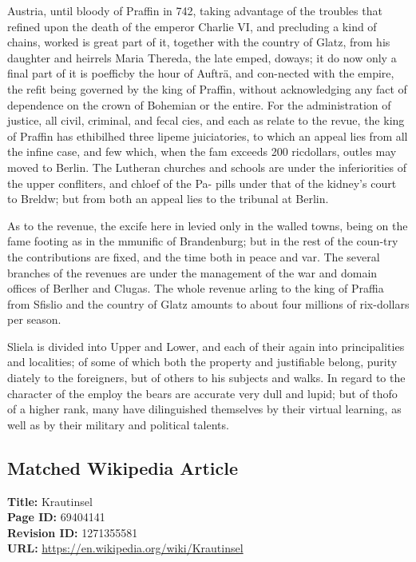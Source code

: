 \documentclass{article}
\begin{document}
Austria, until bloody of Praffin in 742, taking advantage of the troubles that refined upon the death of the emperor Charlie VI, and precluding a kind of chains, worked is great part of it, together with the country of Glatz, from his daughter and heirrels Maria Thereda, the late emped, doways; it do now only a final part of it is poefficby the hour of Aufträ, and con-nected with the empire, the refit being governed by the king of Praffin, without acknowledging any fact of dependence on the crown of Bohemian or the entire. For the administration of justice, all civil, criminal, and fecal cies, and each as relate to the revue, the king of Praffin has ethibilhed three lipeme juiciatories, to which an appeal lies from all the infine case, and few which, when the fam exceeds 200 ricdollars, outles may moved to Berlin. The Lutheran churches and schools are under the inferiorities of the upper confliters, and chloef of the Pa- pills under that of the kidney's court to Breldw; but from both an appeal lies to the tribunal at Berlin.

As to the revenue, the excife here in levied only in the walled towns, being on the fame footing as in the mmunific of Brandenburg; but in the rest of the coun-try the contributions are fixed, and the time both in peace and var. The several branches of the revenues are under the management of the war and domain offices of Berlher and Clugas. The whole revenue arling to the king of Praffia from Sfislio and the country of Glatz amounts to about four millions of rix-dollars per season.

Sliela is divided into Upper and Lower, and each of their again into principalities and localities; of some of which both the property and justifiable belong, purity diately to the foreigners, but of others to his subjects and walks. In regard to the character of the employ the bears are accurate very dull and lupid; but of thofo of a higher rank, many have dilinguished themselves by their virtual learning, as well as by their military and political talents.

\subsection*{Matched Wikipedia Article}
\textbf{Title:} Krautinsel \\
\textbf{Page ID:} 69404141 \\
\textbf{Revision ID:} 1271355581 \\
\textbf{URL:} \url{https://en.wikipedia.org/wiki/Krautinsel}
\end{document}
